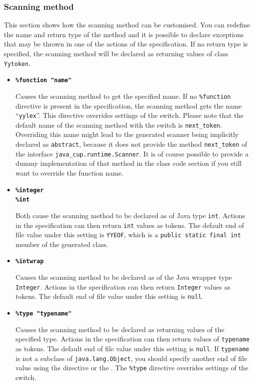 \documentclass[11pt]{scrartcl}
\newcommand{\bl}{\latex{\symbol{123}}\html{\{}}
\newcommand{\br}{\latex{\symbol{125}}\html{\}}}
\begin{document}
\subsubsection{Scanning method}\label{ScanningMethod}
This section shows how the scanning method can be customised. You can redefine
the name and return type of the method and it is possible to declare
exceptions that may be thrown in one of the actions of the specification.
If no return type is specified, the scanning method will be declared as
returning values of class \texttt{Yytoken}.
\begin{itemize}
\item
{\bfseries \texttt{\%function "name"}}

Causes the scanning method to get the specified name. If no \texttt{\%function}
directive is present in the specification, the scanning method gets the
name ``\texttt{yylex}''. This directive overrides settings of the 
\texttt{} switch. Please note that the default name
of the scanning method with the \texttt{} switch is
\texttt{next\_token}. Overriding this name might lead to the generated scanner
being implicitly declared as \texttt{abstract}, because it does not provide
the method \texttt{next\_token} of the interface \texttt{java\_cup.runtime.Scanner}.
It is of course possible to provide a dummy implementation of that method
in the class code section if you still want to override the function name.
 
\item
{\bfseries \texttt{\%integer}}\\
{\bfseries \texttt{\%int}}

Both cause the scanning method to be declared as of Java type \texttt{int}.
Actions in the specification can then return \texttt{int} values as tokens.
The default end of file value under this setting is \texttt{YYEOF}, which is a \texttt{public
static final int} member of the generated class.
 
\item
{\bfseries \texttt{\%intwrap}}

Causes the scanning method to be declared as of the Java wrapper type
\texttt{Integer}. Actions in the specification can then return \texttt{Integer}
values as tokens. The default end of file value under this setting is \texttt{null}.
 
\item
{\bfseries \texttt{\%type "typename"}}

Causes the scanning method to be declared as returning values of the specified type.
Actions in the specification can then return values of \texttt{typename}
as tokens. The default end of file value under this setting is \texttt{null}.
If \texttt{typename} is not a subclass of \texttt{java.lang.Object},
you should specify another end of file value using the
\htmlref{\texttt{\%eofval\bl} \texttt{...} \texttt{\%eofval\br}}{eofval}
directive or the . 
The \texttt{\%type} directive overrides settings of the 
\texttt{} switch.
 

\end{itemize}
\end{document}
